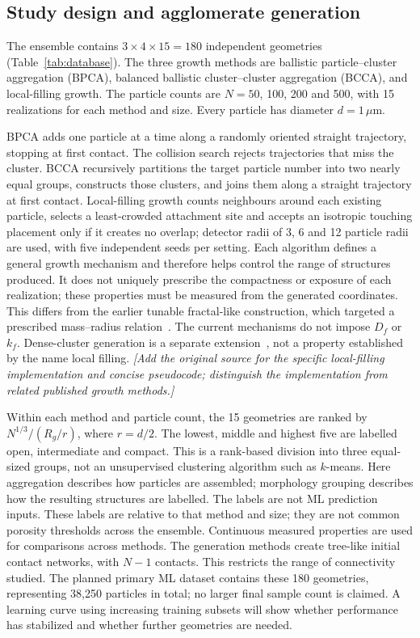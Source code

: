 \documentclass[11pt,a4paper]{article}
\newcommand{\pending}[1]{{\color{red}\textit{[#1]}}}
\begin{document}
\subsection{Study design and agglomerate generation}
The ensemble contains $3\times4\times15=180$ independent geometries (Table~\ref{tab:database}).
 The three growth methods are ballistic particle--cluster aggregation (BPCA), balanced ballistic cluster--cluster aggregation (BCCA), and local-filling growth. The particle counts are $N=50$, 100, 200 and 500, with 15 realizations for each method and size. Every particle has diameter $d=1\,\mu\mathrm{m}$.

BPCA adds one particle at a time along a randomly oriented straight trajectory, stopping at first contact. The collision search rejects trajectories that miss the cluster. BCCA recursively partitions the target particle number into two nearly equal groups, constructs those clusters, and joins them along a straight trajectory at first contact. Local-filling growth counts neighbours around each existing particle, selects a least-crowded attachment site and accepts an isotropic touching placement only if it creates no overlap; detector radii of 3, 6 and 12 particle radii are used, with five independent seeds per setting. Each algorithm defines a general growth mechanism and therefore helps control the range of structures produced. It does not uniquely prescribe the compactness or exposure of each realization; these properties must be measured from the generated coordinates. This differs from the earlier tunable fractal-like construction, which targeted a prescribed mass--radius relation~\cite{Filippov2000,Skorupski2014}. The current mechanisms do not impose $D_f$ or $k_f$. Dense-cluster generation is a separate extension~\cite{Ehrl2009}, not a property established by the name local filling. \pending{Add the original source for the specific local-filling implementation and concise pseudocode; distinguish the implementation from related published growth methods.}

Within each method and particle count, the 15 geometries are ranked by $N^{1/3}/(R_g/r)$, where $r=d/2$. The lowest, middle and highest five are labelled open, intermediate and compact. This is a rank-based division into three equal-sized groups, not an unsupervised clustering algorithm such as $k$-means. Here aggregation describes how particles are assembled; morphology grouping describes how the resulting structures are labelled. The labels are not ML prediction inputs. These labels are relative to that method and size; they are not common porosity thresholds across the ensemble. Continuous measured properties are used for comparisons across methods. The generation methods create tree-like initial contact networks, with $N-1$ contacts. This restricts the range of connectivity studied. The planned primary ML dataset contains these 180 geometries, representing 38,250 particles in total; no larger final sample count is claimed. A learning curve using increasing training subsets will show whether performance has stabilized and whether further geometries are needed.

\end{document}
